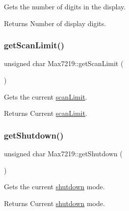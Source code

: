 Gets the number of digits in the display. \begin{DoxyReturn}{Returns}
Number of display digits. 
\end{DoxyReturn}
\mbox{\label{classdrumpi_1_1Max7219_a3ec0ff91fa65b1d6a1c435b15cb4604e}} 
\subsubsection{\texorpdfstring{get\+Scan\+Limit()}{getScanLimit()}}
{\footnotesize\ttfamily unsigned char Max7219\+::get\+Scan\+Limit (\begin{DoxyParamCaption}{ }\end{DoxyParamCaption})}

Gets the current \hyperlink{classdrumpi_1_1Max7219_a605af97de38c0f8fd581ba17e6ce4f37}{scan\+Limit}. \begin{DoxyReturn}{Returns}
Current \hyperlink{classdrumpi_1_1Max7219_a605af97de38c0f8fd581ba17e6ce4f37}{scan\+Limit}. 
\end{DoxyReturn}
\mbox{\label{classdrumpi_1_1Max7219_af2a8322c6ac792793fd9b2c6d7f389fd}} 
\subsubsection{\texorpdfstring{get\+Shutdown()}{getShutdown()}}
{\footnotesize\ttfamily unsigned char Max7219\+::get\+Shutdown (\begin{DoxyParamCaption}{ }\end{DoxyParamCaption})}

Gets the current \hyperlink{classdrumpi_1_1Max7219_a0b1b2c31442fe9a3a1db3cdae5dd32e8}{shutdown} mode. \begin{DoxyReturn}{Returns}
Current \hyperlink{classdrumpi_1_1Max7219_a0b1b2c31442fe9a3a1db3cdae5dd32e8}{shutdown} mode. 
\end{DoxyReturn}
\mbox{\label{classdrumpi_1_1Max7219_a237f07a9f87919651cc30cb5afacbc7d}} 
